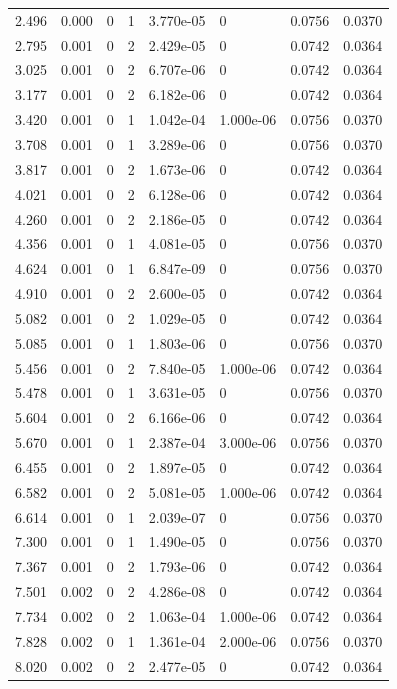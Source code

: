 \documentclass[preview]{standalone}
\begin{document}
{{\begin{tabular}{L{1.2cm}C{1.2cm} C{0.3cm}C{0.5cm} C{1.4cm}C{1.4cm} C{1.4cm}C{1.4cm}}
  2.496  &  0.000  & 0     &  1 &  3.770e-05  & 0  & 0.0756 &  0.0370   \\ 
  2.795  &  0.001  & 0     &  2 &  2.429e-05  & 0  & 0.0742 &  0.0364   \\ 
  3.025  &  0.001  & 0     &  2 &  6.707e-06  & 0  & 0.0742 &  0.0364   \\ 
  3.177  &  0.001  & 0     &  2 &  6.182e-06  & 0  & 0.0742 &  0.0364   \\ 
  3.420  &  0.001  & 0     &  1 &  1.042e-04  & 1.000e-06  & 0.0756 &  0.0370   \\ 
  3.708  &  0.001  & 0     &  1 &  3.289e-06  & 0  & 0.0756 &  0.0370   \\ 
  3.817  &  0.001  & 0     &  2 &  1.673e-06  & 0  & 0.0742 &  0.0364   \\ 
  4.021  &  0.001  & 0     &  2 &  6.128e-06  & 0  & 0.0742 &  0.0364   \\ 
  4.260  &  0.001  & 0     &  2 &  2.186e-05  & 0  & 0.0742 &  0.0364   \\ 
  4.356  &  0.001  & 0     &  1 &  4.081e-05  & 0  & 0.0756 &  0.0370   \\ 
  4.624  &  0.001  & 0     &  1 &  6.847e-09  & 0  & 0.0756 &  0.0370   \\ 
  4.910  &  0.001  & 0     &  2 &  2.600e-05  & 0  & 0.0742 &  0.0364   \\ 
  5.082  &  0.001  & 0     &  2 &  1.029e-05  & 0  & 0.0742 &  0.0364   \\ 
  5.085  &  0.001  & 0     &  1 &  1.803e-06  & 0  & 0.0756 &  0.0370   \\ 
  5.456  &  0.001  & 0     &  2 &  7.840e-05  & 1.000e-06  & 0.0742 &  0.0364   \\ 
  5.478  &  0.001  & 0     &  1 &  3.631e-05  & 0  & 0.0756 &  0.0370   \\ 
  5.604  &  0.001  & 0     &  2 &  6.166e-06  & 0  & 0.0742 &  0.0364   \\ 
  5.670  &  0.001  & 0     &  1 &  2.387e-04  & 3.000e-06  & 0.0756 &  0.0370   \\ 
  6.455  &  0.001  & 0     &  2 &  1.897e-05  & 0  & 0.0742 &  0.0364   \\ 
  6.582  &  0.001  & 0     &  2 &  5.081e-05  & 1.000e-06  & 0.0742 &  0.0364   \\ 
  6.614  &  0.001  & 0     &  1 &  2.039e-07  & 0  & 0.0756 &  0.0370   \\ 
  7.300  &  0.001  & 0     &  1 &  1.490e-05  & 0  & 0.0756 &  0.0370   \\ 
  7.367  &  0.001  & 0     &  2 &  1.793e-06  & 0  & 0.0742 &  0.0364   \\ 
  7.501  &  0.002  & 0     &  2 &  4.286e-08  & 0  & 0.0742 &  0.0364   \\ 
  7.734  &  0.002  & 0     &  2 &  1.063e-04  & 1.000e-06  & 0.0742 &  0.0364   \\ 
  7.828  &  0.002  & 0     &  1 &  1.361e-04  & 2.000e-06  & 0.0756 &  0.0370   \\ 
  8.020  &  0.002  & 0     &  2 &  2.477e-05  & 0  & 0.0742 &  0.0364   \\ 
\hline 
\end{tabular} 

}}
\end{document}
